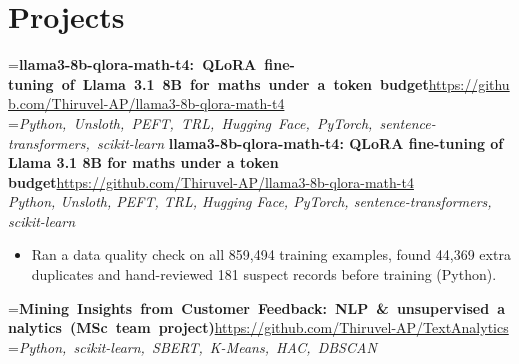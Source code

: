 \documentclass[a4paper,11pt]{article}
\newcommand{\project}[3]{%
  \textbf{#1}\hfill#3\\ {\color{muted}\small\textit{#2}}\par}
\newcommand{\gap}{\vspace{5pt}}
\begin{document}
\section{Projects}
=\hbox{\textbf{llama3-8b-qlora-math-t4: QLoRA fine-tuning of Llama 3.1 8B for maths under a token budget}\hspace{1em}\url{https://github.com/Thiruvel-AP/llama3-8b-qlora-math-t4}}%
=\hbox{{\small\textit{Python, Unsloth, PEFT, TRL, Hugging Face, PyTorch, sentence-transformers, scikit-learn}}}%
\ifdim\wd0>\linewidth
\ifdim\wd2>\linewidth
\textbf{llama3-8b-qlora-math-t4: QLoRA fine-tuning of Llama 3.1 8B for maths under a token budget}\\ {\color{muted}\small\textit{Python, Unsloth, PEFT, TRL, Hugging Face, PyTorch, sentence-transformers, scikit-learn}}\\ \hspace*{\fill}{\small\url{https://github.com/Thiruvel-AP/llama3-8b-qlora-math-t4}}\par
\else
\textbf{llama3-8b-qlora-math-t4: QLoRA fine-tuning of Llama 3.1 8B for maths under a token budget}\\ {\color{muted}\small\textit{Python, Unsloth, PEFT, TRL, Hugging Face, PyTorch, sentence-transformers, scikit-learn}}\hfill{\small\url{https://github.com/Thiruvel-AP/llama3-8b-qlora-math-t4}}\par
\fi
\else
\project{llama3-8b-qlora-math-t4: QLoRA fine-tuning of Llama 3.1 8B for maths under a token budget}{Python, Unsloth, PEFT, TRL, Hugging Face, PyTorch, sentence-transformers, scikit-learn}{\url{https://github.com/Thiruvel-AP/llama3-8b-qlora-math-t4}}
\fi
\begin{itemize}
  \item Ran a data quality check on all 859,494 training examples, found 44,369 extra duplicates and hand-reviewed 181 suspect records before training (Python).
\end{itemize}
\gap
{}
=\hbox{\textbf{Mining Insights from Customer Feedback: NLP \& unsupervised analytics (MSc team project)}\hspace{1em}\url{https://github.com/Thiruvel-AP/TextAnalytics}}%
=\hbox{{\small\textit{Python, scikit-learn, SBERT, K-Means, HAC, DBSCAN}}}%
\end{document}
